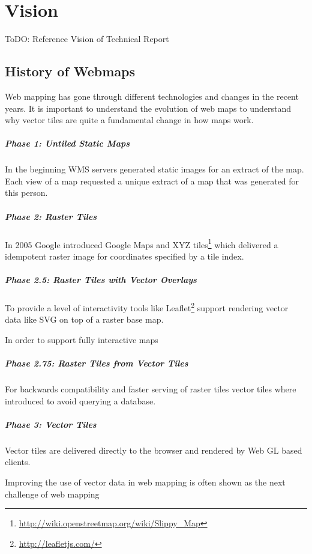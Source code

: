 \chapter{Vision}\label{vision}

ToDO: Reference Vision of Technical Report

\section{History of Webmaps}
\label{history-of-webmaps}

Web mapping has gone through different technologies and changes in
the recent years. It is important to understand the evolution of web maps to understand why vector tiles are quite a fundamental change in how maps work.

\paragraph{Phase 1: Untiled Static
Maps}

In the beginning WMS servers generated static images for an extract
of the map. Each view of a map requested a unique extract of a map that was generated for this person.


\paragraph{Phase 2: Raster Tiles}

In 2005 Google introduced Google Maps and XYZ 
tiles\footnote{\url{http://wiki.openstreetmap.org/wiki/Slippy_Map}}
which delivered a idempotent raster image for coordinates specified by a
tile index.


\paragraph{Phase 2.5: Raster Tiles with Vector
Overlays}

To provide a level of interactivity tools like
Leaflet\footnote{\url{http://leafletjs.com/}} support rendering vector
data like SVG on top of a raster base map.

In order to support fully interactive maps 

\paragraph{Phase 2.75: Raster Tiles from Vector
Tiles}

For backwards compatibility and faster serving of raster tiles vector
tiles where introduced to avoid querying a database.

\paragraph{Phase 3: Vector Tiles}

Vector tiles are delivered directly to the browser and rendered by Web
GL based clients.


Improving the use of vector data in web mapping is often shown as the next challenge
of web mapping \cite[p.~88]{gaffuri2012toward} 
